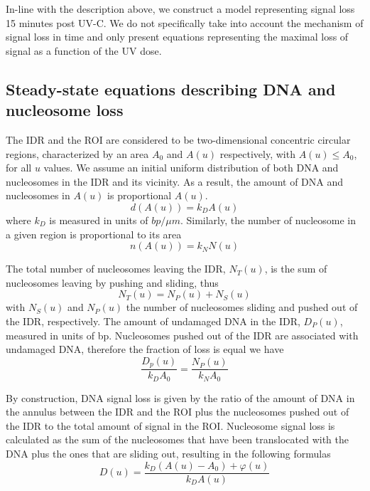 \documentclass[12pt]{article}
\begin{document}
    In-line with the description above, we construct a model representing
	signal loss 15 minutes post UV-C. We do not specifically take into account the
	mechanism of signal loss in time and only present equations representing the maximal loss of signal as a function of the UV dose.
	
	\subsection{Steady-state equations describing DNA and nucleosome loss}
	The IDR and the ROI are considered to be two-dimensional concentric circular regions, characterized by an area $A_0$ and $A(u)$ respectively,
	with $A(u)\leq A_0$, for all $u$ values. We assume an initial uniform distribution of both DNA and nucleosomes in the IDR and its vicinity. As a result, the amount of DNA and nucleosomes in $A(u)$ is proportional $A(u)$. 
	\begin{equation*}
	d(A(u))= k_DA(u)
	\end{equation*}
	where $k_D$ is measured in units of $bp/\mu m$. Similarly, the number of nucleosome in a given region is proportional to its area
	\begin{equation*}
	n(A(u))=k_NN(u)
	\end{equation*}
	
	The total number of nucleosomes leaving the IDR, $N_T(u)$, is the sum of nucleosomes leaving by pushing and sliding, thus 
	\begin{equation*}
	N_T(u) = N_P(u) + N_S(u)
	\end{equation*}
	with $N_S(u)$ and $N_P(u)$ the number of nucleosomes sliding and pushed out
	of the IDR, respectively. The amount of undamaged DNA in the IDR, $D_P(u)$, measured in units of bp.   
	Nucleosomes pushed out of the IDR are associated
	with undamaged DNA, therefore the fraction of loss is equal we have 
	\begin{equation*}
	\frac{D_p(u)}{k_DA_0} = \frac{N_P(u)}{k_NA_0}
	\end{equation*} 
		
	By construction, DNA signal loss is given by the ratio of the amount of
	DNA in the annulus between the IDR and the ROI plus the nucleosomes
	pushed out of the IDR to the total amount of signal in the ROI. Nucleosome signal loss is calculated as the sum of the nucleosomes that have been
	translocated with the DNA plus the ones that are sliding out, resulting in
	the following formulas
	\begin{equation}\label{eq:DNAstst}
	D(u) = \frac{k_D(A(u)-A_0) + \varphi(u)}{k_DA(u)}	
	\end{equation}
	
\end{document}
